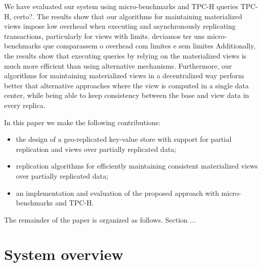 \documentclass{vldb}
\newcommand{\grumbler}[2]{{\color{red}{\bf #1:} #2}}
\newcommand{\nuno}[1]{\grumbler{nuno}{#1}}
\newcommand{\outline}[1]{}
\begin{document}
We have evaluated our system using micro-benchmarks and TPC-H queries \cite{} \nuno{TPC-H, certo?}.
The results show that our algorithms for maintaining materialized views impose 
low overhead when executing and asynchronously replicating transactions, particularly
for views with limits.
\nuno{deviamos ter uns micro-benchmarks que comparassem o overhead com limites e sem limites}
Additionally, the results show that executing queries by relying on the materialized views is much more 
efficient than using alternative mechanisms.  
Furthermore, our algorithms for maintaining materialized views in a decentralized way perform better 
that alternative approaches where the view is computed in a single data center, while being
able to  keep consistency between the base and view data in every replica.

In this paper we make the following contributions:
\begin{itemize}
	\item the design of a geo-replicated key-value store  with support for partial replication
	and views over partially replicated data; 
	\item replication algorithms for efficiently maintaining consistent materialized views over 
	partially replicated data;
	 \item an implementation and evaluation of the proposed approach with micro-benchmarks
	 and TPC-H.
\end{itemize}

The remainder of the paper is organized as follows. Section ...

\outline{topicos

\begin{itemize}
	\item Num. DC a aumentar
	\item Replicar totalmente tem problemas
	\item Replicação parcial
	\item Queries sobre dados replicados parcialmente
	\begin{itemize}
		\item Standard solution?
	\end{itemize}
	\item Views materializadas replicadas totalmente
	\item Contribuições
\end{itemize}
}

\section{System overview}
\end{document}
